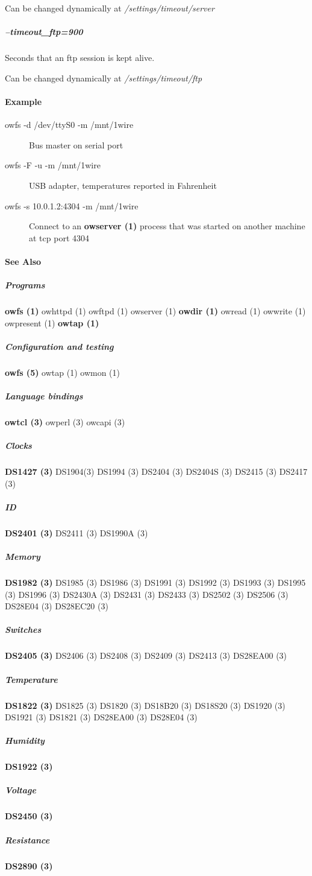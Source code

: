 Can be
changed dynamically at  \textit{/settings/timeout/server} 
\subparagraph*{--timeout\_ftp=900}Seconds
that an ftp session is kept alive. 

Can be changed dynamically at  \textit{/settings/timeout/ftp}
 
\paragraph*{Example}
\begin{description}
\item [owfs -d /dev/ttyS0 -m /mnt/1wire ] Bus master on serial port 
\item [owfs -F
-u -m /mnt/1wire ] USB adapter, temperatures reported in Fahrenheit 
\item [owfs -s
10.0.1.2:4304 -m /mnt/1wire ] Connect to an  \textsf{\textbf{owserver (1)}} process that was started
on another machine at tcp port 4304 
\end{description}

\paragraph*{See Also}

\subparagraph*{Programs}\textsf{\textbf{owfs (1)} \textsf{owhttpd (1)}
\textsf{owftpd (1)} \textsf{owserver (1)}} \textsf{\textbf{owdir (1)} \textsf{owread (1)} \textsf{owwrite (1)} \textsf{owpresent (1)}}
\textsf{\textbf{owtap (1)}} 
\subparagraph*{Configuration and testing}\textsf{\textbf{owfs (5)} \textsf{owtap (1)} \textsf{owmon (1)}} 
\subparagraph*{Language
bindings}\textsf{\textbf{owtcl (3)} \textsf{owperl (3)} \textsf{owcapi (3)}} 
\subparagraph*{Clocks}\textsf{\textbf{DS1427 (3)} \textsf{DS1904(3)} \textsf{DS1994
(3)} \textsf{DS2404 (3)} \textsf{DS2404S (3)} \textsf{DS2415 (3)} \textsf{DS2417 (3)}} 
\subparagraph*{ID}\textsf{\textbf{DS2401 (3)} \textsf{DS2411 (3)}
\textsf{DS1990A (3)}} 
\subparagraph*{Memory}\textsf{\textbf{DS1982 (3)} \textsf{DS1985 (3)} \textsf{DS1986 (3)} \textsf{DS1991 (3)} \textsf{DS1992 (3)}
\textsf{DS1993 (3)} \textsf{DS1995 (3)} \textsf{DS1996 (3)} \textsf{DS2430A (3)} \textsf{DS2431 (3)} \textsf{DS2433 (3)} \textsf{DS2502
(3)} \textsf{DS2506 (3)} \textsf{DS28E04 (3)} \textsf{DS28EC20 (3)}} 
\subparagraph*{Switches}\textsf{\textbf{DS2405 (3)} \textsf{DS2406 (3)} \textsf{DS2408
(3)} \textsf{DS2409 (3)} \textsf{DS2413 (3)} \textsf{DS28EA00 (3)}} 
\subparagraph*{Temperature}\textsf{\textbf{DS1822 (3)} \textsf{DS1825 (3)}
\textsf{DS1820 (3)} \textsf{DS18B20 (3)} \textsf{DS18S20 (3)} \textsf{DS1920 (3)} \textsf{DS1921 (3)} \textsf{DS1821 (3)} \textsf{DS28EA00
(3)} \textsf{DS28E04 (3)}} 
\subparagraph*{Humidity}\textsf{\textbf{DS1922 (3)}} 
\subparagraph*{Voltage}\textsf{\textbf{DS2450 (3)}} 
\subparagraph*{Resistance}\textsf{\textbf{DS2890 (3)}}

